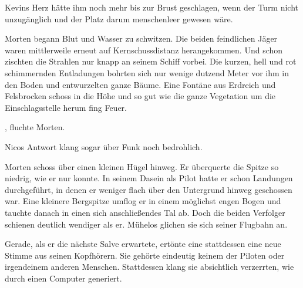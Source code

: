 \par

Kevins Herz hätte ihm noch mehr bis zur Brust geschlagen, wenn der Turm nicht unzugänglich und der Platz darum menschenleer gewesen wäre.

\par

Morten begann Blut und Wasser zu schwitzen. Die beiden feindlichen Jäger waren mittlerweile erneut auf Kernschussdistanz herangekommen. Und schon zischten die Strahlen nur knapp an seinem Schiff vorbei. Die kurzen, hell und rot schimmernden Entladungen bohrten sich nur wenige dutzend Meter vor ihm in den Boden und entwurzelten ganze Bäume. Eine Fontäne aus Erdreich und Felsbrocken schoss in die Höhe und so gut wie die ganze Vegetation um die Einschlagsstelle herum fing Feuer.

\par

, fluchte Morten. 

\par

 Nicos Antwort klang sogar über Funk noch bedrohlich. 

\par

Morten schoss über einen kleinen Hügel hinweg. Er überquerte die Spitze so niedrig, wie er nur konnte. In seinem Dasein als Pilot hatte er schon Landungen durchgeführt, in denen er weniger flach über den Untergrund hinweg geschossen war. Eine kleinere Bergspitze umflog er in einem möglichst engen Bogen und tauchte danach in einen sich anschließendes Tal ab. Doch die beiden Verfolger schienen deutlich wendiger als er. Mühelos glichen sie sich seiner Flugbahn an.

\par

Gerade, als er die nächste Salve erwartete, ertönte eine stattdessen eine neue Stimme aus seinen Kopfhörern. Sie gehörte eindeutig keinem der Piloten oder irgendeinem anderen Menschen. Stattdessen klang sie absichtlich verzerrten, wie durch einen Computer generiert.

\par


\par

